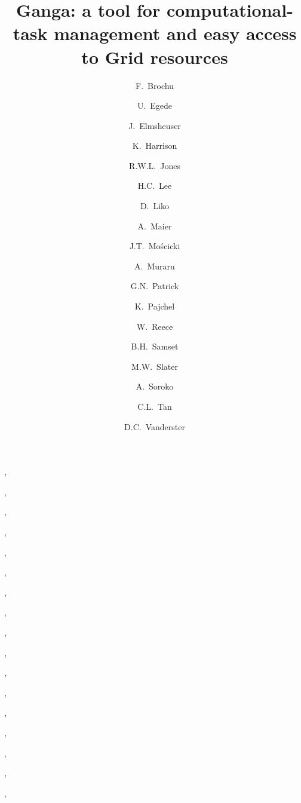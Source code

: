 \documentclass{elsart}
\def\grid {Grid\xspace}
\begin{document}
\begin{frontmatter}





\title{\large{Ganga: a tool for computational-task
management and easy access to \grid resources}}




\author[a:Cambridge]{F.~Brochu},
\author[a:Imperial]{U.~Egede},
\author[a:Munich]{J.~Elmsheuser},
\author[a:Cambridge]{K.~Harrison},
\author[a:Lancaster]{R.W.L.~Jones},
\author[a:CERN]{H.C.~Lee},
\author[a:CERN]{D.~Liko},
\author[a:CERN]{A.~Maier},
\author[a:CERN]{J.T.~Mo{\'s}cicki},
\author[a:CERN]{A.~Muraru},
\author[a:STFC]{G.N.~Patrick},
\author[a:Oslo]{K.~Pajchel},
\author[a:Imperial]{W.~Reece},
\author[a:Oslo]{B.H.~Samset},
\author[a:Birmingham]{M.W.~Slater},
\author[a:Oxford]{A.~Soroko},
\author[a:Birmingham]{C.L.~Tan},
\author[a:CERN]{D.C.~Vanderster}

\address[a:Cambridge]{University of Cambridge, Cambridge, United Kingdom}
\address[a:Imperial]{Imperial College London, London, United Kingdom}
\address[a:Munich]{Ludwig-Maximilians-Universit\"{a}t, Munich, Germany}
\address[a:Lancaster]{Lancaster University, Lancaster, United Kingdom}
\address[a:CERN]{CERN, Geneva, Switzerland}
\address[a:STFC]{Science \& Technology Facilities Council, United Kingdom}
\address[a:Oxford]{University of Oxford, Oxford, United Kingdom}
\address[a:Birmingham]{University of Birmingham, Birmingham, United Kingdom}
\address[a:Oslo]{University of Oslo, Oslo, Norway}


\end{frontmatter}
\end{document}
